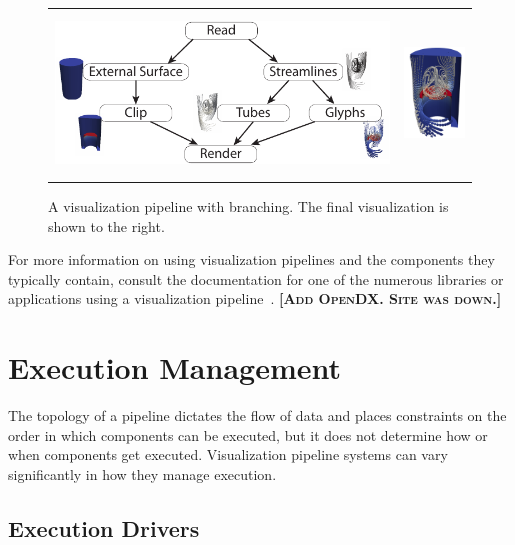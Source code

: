 \documentclass{article}
\newcommand*{\lcite}[1]{~\cite{#1}}
\newcommand{\fix}[1]{{\color{red}\textbf{\textsc{[#1]}}}}
\begin{document}
\begin{figure}[htbp]
  \centering
  \begin{tabular}{cc}
    \includegraphics{images/BranchingPipeline} &
    \includegraphics[height=1.7in]{images/BranchingPipelineResult}
  \end{tabular}
  \caption{A visualization pipeline with branching.  The final
    visualization is shown to the right.}
  \label{fig:BranchingPipeline}
\end{figure}

For more information on using visualization pipelines and the components
they typically contain, consult the documentation for one of the numerous
libraries or applications using a visualization
pipeline\lcite{VTK,ParaView,ParaViewTutorial,SCIRunUserGuide,IRISExplorerUsersGuide,VisTrailsDocumentation}.
\fix{Add OpenDX.  Site was down.}


\section{Execution Management}
\label{sec:ExecutionManagement}

The topology of a pipeline dictates the flow of data and places constraints
on the order in which components can be executed, but it does not determine
how or when components get executed.  Visualization pipeline systems can
vary significantly in how they manage execution.

\subsection{Execution Drivers}
\label{sec:ExecutionDrivers}
\end{document}
